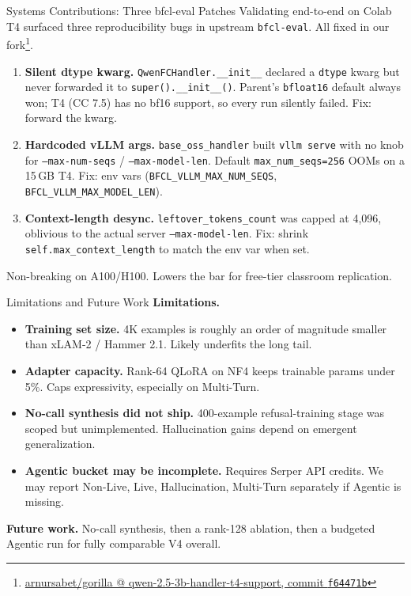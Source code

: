 \documentclass[aspectratio=169,11pt]{beamer}
\begin{document}
\begin{frame}{Systems Contributions: Three bfcl-eval Patches}
  Validating end-to-end on Colab T4 surfaced three reproducibility bugs in upstream \texttt{bfcl-eval}. All fixed in our fork\footnote{\href{https://github.com/arnursabet/gorilla/tree/qwen-2.5-3b-handler-t4-support}{arnursabet/gorilla @ qwen-2.5-3b-handler-t4-support, commit \texttt{f64471b}}}.
  \vspace{4pt}
  \begin{enumerate}
    \item \textbf{Silent dtype kwarg.} \texttt{QwenFCHandler.\_\_init\_\_} declared a \texttt{dtype} kwarg but never forwarded it to \texttt{super().\_\_init\_\_()}. Parent's \texttt{bfloat16} default always won; T4 (CC 7.5) has no bf16 support, so every run silently failed. Fix: forward the kwarg.
    \item \textbf{Hardcoded vLLM args.} \texttt{base\_oss\_handler} built \texttt{vllm serve} with no knob for \texttt{--max-num-seqs} / \texttt{--max-model-len}. Default \texttt{max\_num\_seqs=256} OOMs on a 15\,GB T4. Fix: env vars (\texttt{BFCL\_VLLM\_MAX\_NUM\_SEQS}, \texttt{BFCL\_VLLM\_MAX\_MODEL\_LEN}).
    \item \textbf{Context-length desync.} \texttt{leftover\_tokens\_count} was capped at 4{,}096, oblivious to the actual server \texttt{--max-model-len}. Fix: shrink \texttt{self.max\_context\_length} to match the env var when set.
  \end{enumerate}
  \vspace{2pt}
  {\small\color{dimgray} Non-breaking on A100/H100. Lowers the bar for free-tier classroom replication.}
\end{frame}

\begin{frame}{Limitations and Future Work}
  \textbf{Limitations.}
  \begin{itemize}
    \item \textbf{Training set size.} 4K examples is roughly an order of magnitude smaller than xLAM-2 / Hammer 2.1. Likely underfits the long tail.
    \item \textbf{Adapter capacity.} Rank-64 QLoRA on NF4 keeps trainable params under 5\%. Caps expressivity, especially on Multi-Turn.
    \item \textbf{No-call synthesis did not ship.} 400-example refusal-training stage was scoped but unimplemented. Hallucination gains depend on emergent generalization.
    \item \textbf{Agentic bucket may be incomplete.} Requires Serper API credits. We may report Non-Live, Live, Hallucination, Multi-Turn separately if Agentic is missing.
  \end{itemize}

  \textbf{Future work.} No-call synthesis, then a rank-128 ablation, then a budgeted Agentic run for fully comparable V4 overall.
\end{frame}
\end{document}
